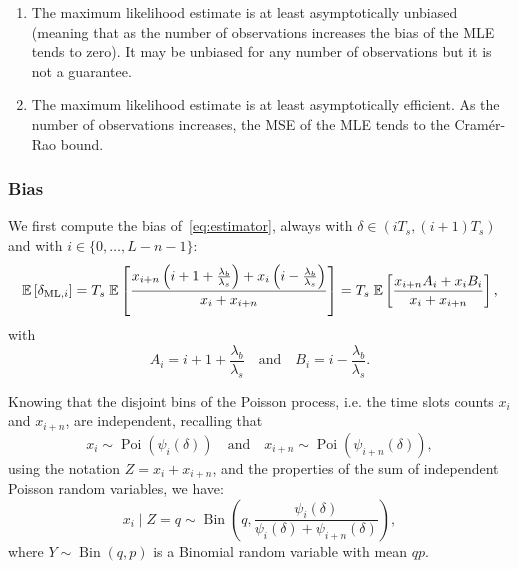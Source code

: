 \begin{enumerate}
    \item The maximum likelihood estimate is at least asymptotically unbiased (meaning that as the number of observations increases the bias of the MLE tends to zero). It may be unbiased for any number of observations but it is not a guarantee.
    \item The maximum likelihood estimate is at least asymptotically efficient. As the number of observations increases, the MSE of the MLE tends to the Cramér-Rao bound.
\end{enumerate}

\noindent
\subsubsection{Bias}

\noindent
We first compute the bias of~\eqref{eq:estimator}, always with \(\delta \in(iT_s,(i+1)T_s)\) and with \(i\in\{0, \ldots, L-n-1\}\):
\begin{equation}
\mathbb{E}\left[{\delta_{\mathrm{ML}, i}}\right]
=
T_s \;
\mathbb{E}\left[{
\frac{x_{i+n}\left(i+1 +\frac{\lambda_b}{\lambda_s} \right)+x_i\left(i -\frac{\lambda_b}{\lambda_s} \right)}{x_i+x_{i+n}}
}\right]
=
T_s \;
\mathbb{E}\left[{
\frac{x_{i+n}A_i+x_iB_i}{x_i+x_{i+n}}
}\right],
\label{eq:previously}
\end{equation}
with
\begin{equation}
A_i =i+1 +\frac{\lambda_b}{\lambda_s}
\quad \text{and} \quad
B_i =i -\frac{\lambda_b}{\lambda_s}.
\label{eq:definitions}
\end{equation}

\noindent
Knowing that the disjoint bins of the Poisson process, i.e. the time slots counts \(x_i\) and \(x_{i+n}\), are independent, recalling that 
\begin{equation}
x_i \sim \operatorname{Poi}\left(\psi_i(\delta)\right)
\quad \text{and} \quad
x_{i+n} \sim \operatorname{Poi}\left(\psi_{i+n}(\delta)\right),
\end{equation}
using the notation \(Z=x_i+x_{i+n}\), and the properties of the sum of independent Poisson random variables, we have:
\begin{equation}
x_i \mid Z =q\sim \operatorname{Bin}\left(q,\frac{\psi_{i}(\delta)}{\psi_{i}(\delta)+\psi_{i+n}(\delta)}\right),
\label{eq:thebinomial}
\end{equation}
where \(Y\sim \operatorname{Bin}(q,p)\) is a Binomial random variable with mean \(qp\). 

